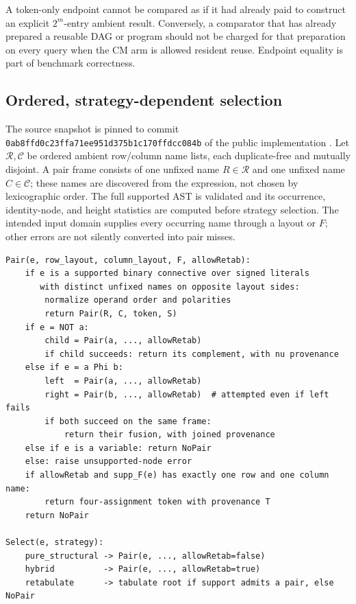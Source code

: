 \documentclass[10pt]{article}
\theoremstyle{plain}
\theoremstyle{definition}
\theoremstyle{remark}
\begin{document}
A token-only endpoint cannot be compared as if it had already paid to construct an explicit $2^m$-entry ambient result. Conversely, a comparator that has already prepared a reusable DAG or program should not be charged for that preparation on every query when the CM arm is allowed resident reuse. Endpoint equality is part of benchmark correctness.

\subsection{Ordered, strategy-dependent selection}
\label{sec:selection}

The source snapshot is pinned to commit \texttt{0ab8ffd0c23ffa71ee951d375b1c170ffdcc084b} of the public implementation \cite{CompilerSnapshot2026}. Let $\mathcal R,\mathcal C$ be ordered ambient row/column name lists, each duplicate-free and mutually disjoint. A pair frame consists of one unfixed name $R\in\mathcal R$ and one unfixed name $C\in\mathcal C$; these names are discovered from the expression, not chosen by lexicographic order. The full supported AST is validated and its occurrence, identity-node, and height statistics are computed before strategy selection. The intended input domain supplies every occurring name through a layout or $F$; other errors are not silently converted into pair misses.

\begin{lstlisting}
Pair(e, row_layout, column_layout, F, allowRetab):
    if e is a supported binary connective over signed literals
       with distinct unfixed names on opposite layout sides:
        normalize operand order and polarities
        return Pair(R, C, token, S)
    if e = NOT a:
        child = Pair(a, ..., allowRetab)
        if child succeeds: return its complement, with nu provenance
    else if e = a Phi b:
        left  = Pair(a, ..., allowRetab)
        right = Pair(b, ..., allowRetab)  # attempted even if left fails
        if both succeed on the same frame:
            return their fusion, with joined provenance
    else if e is a variable: return NoPair
    else: raise unsupported-node error
    if allowRetab and supp_F(e) has exactly one row and one column name:
        return four-assignment token with provenance T
    return NoPair

Select(e, strategy):
    pure_structural -> Pair(e, ..., allowRetab=false)
    hybrid          -> Pair(e, ..., allowRetab=true)
    retabulate      -> tabulate root if support admits a pair, else NoPair
\end{lstlisting}
\end{document}
